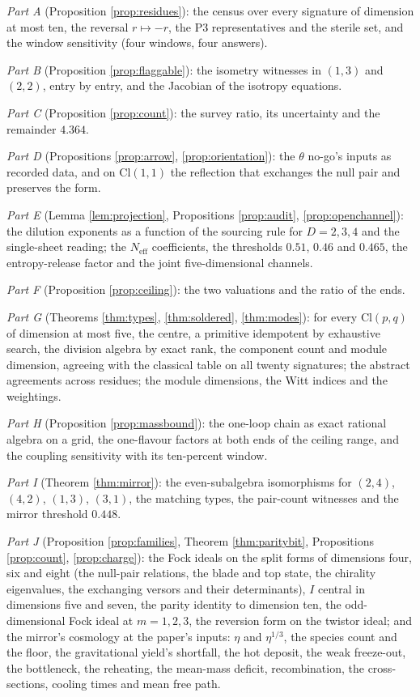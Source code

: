 \documentclass[11pt]{article}
\theoremstyle{definition}
\newcommand{\Cl}{\mathrm{Cl}}
\newcommand{\Neff}{N_{\mathrm{eff}}}
\begin{document}
\emph{Part A} (Proposition \ref{prop:residues}): the census over every signature of dimension at most ten, the reversal $r \mapsto -r$, the P3 representatives and the sterile set, and the window sensitivity (four windows, four answers).

\emph{Part B} (Proposition \ref{prop:flaggable}): the isometry witnesses in $(1,3)$ and $(2,2)$, entry by entry, and the Jacobian of the isotropy equations.

\emph{Part C} (Proposition \ref{prop:count}): the survey ratio, its uncertainty and the remainder $4.364$.

\emph{Part D} (Propositions \ref{prop:arrow}, \ref{prop:orientation}): the $\theta$ no-go's inputs as recorded data, and on $\Cl(1,1)$ the reflection that exchanges the null pair and preserves the form.

\emph{Part E} (Lemma \ref{lem:projection}, Propositions \ref{prop:audit}, \ref{prop:openchannel}): the dilution exponents as a function of the sourcing rule for $D = 2, 3, 4$ and the single-sheet reading; the $\Neff$ coefficients, the thresholds $0.51$, $0.46$ and $0.465$, the entropy-release factor and the joint five-dimensional channels.

\emph{Part F} (Proposition \ref{prop:ceiling}): the two valuations and the ratio of the ends.

\emph{Part G} (Theorems \ref{thm:types}, \ref{thm:soldered}, \ref{thm:modes}): for every $\Cl(p,q)$ of dimension at most five, the centre, a primitive idempotent by exhaustive search, the division algebra by exact rank, the component count and module dimension, agreeing with the classical table on all twenty signatures; the abstract agreements across residues; the module dimensions, the Witt indices and the weightings.

\emph{Part H} (Proposition \ref{prop:massbound}): the one-loop chain as exact rational algebra on a grid, the one-flavour factors at both ends of the ceiling range, and the coupling sensitivity with its ten-percent window.

\emph{Part I} (Theorem \ref{thm:mirror}): the even-subalgebra isomorphisms for $(2,4)$, $(4,2)$, $(1,3)$, $(3,1)$, the matching types, the pair-count witnesses and the mirror threshold $0.448$.

\emph{Part J} (Proposition \ref{prop:families}, Theorem \ref{thm:paritybit}, Propositions \ref{prop:count}, \ref{prop:charge}): the Fock ideals on the split forms of dimensions four, six and eight (the null-pair relations, the blade and top state, the chirality eigenvalues, the exchanging versors and their determinants), $I$ central in dimensions five and seven, the parity identity to dimension ten, the odd-dimensional Fock ideal at $m = 1, 2, 3$, the reversion form on the twistor ideal; and the mirror's cosmology at the paper's inputs: $\eta$ and $\eta^{1/3}$, the species count and the floor, the gravitational yield's shortfall, the hot deposit, the weak freeze-out, the bottleneck, the reheating, the mean-mass deficit, recombination, the cross-sections, cooling times and mean free path.
\end{document}
